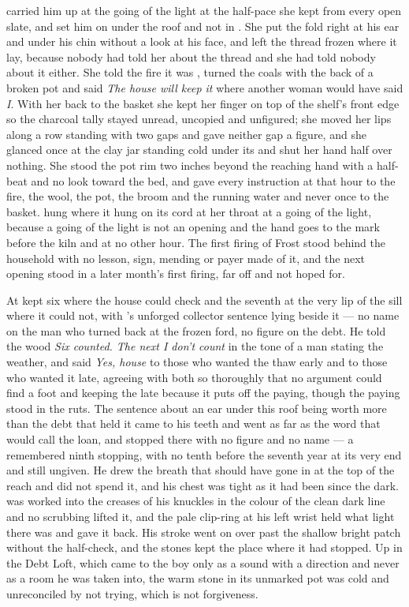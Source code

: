  carried him up at the going of the light at the half-pace she kept from every open slate, and set him on  under the roof and not in . She put the fold right at his ear and under his chin without a look at his face, and left the thread frozen where it lay, because nobody had told her about the thread and she had told nobody about it either. She told the fire it was , turned the coals with the back of a broken pot and said \emph{The house will keep it} where another woman would have said \emph{I}. With her back to the basket she kept her finger on top of the shelf's front edge so the charcoal tally stayed unread, uncopied and unfigured; she moved her lips along a row standing with two gaps and gave neither gap a figure, and she glanced once at the clay jar standing cold under its  and shut her hand half over nothing. She stood the pot rim two inches beyond the reaching hand with a half-beat and no look toward the bed, and gave every instruction at that hour to the fire, the wool, the pot, the broom and the running water and never once to the basket.  hung where it hung on its cord at her throat at a going of the light, because a going of the light is not an opening and the hand goes to the mark before the kiln and at no other hour. The first firing of Frost stood behind the household with no lesson, sign, mending or payer made of it, and the next opening stood in a later month's first firing, far off and not hoped for.

At   kept six where the house could check and the seventh at the very lip of the sill where it could not, with 's unforged collector sentence lying beside it --- no name on the man who turned back at the frozen ford, no figure on the debt. He told the wood \emph{Six counted. The next I don't count} in the tone of a man stating the weather, and said \emph{Yes, house} to those who wanted the thaw early and to those who wanted it late, agreeing with both so thoroughly that no argument could find a foot and keeping the late because it puts off the paying, though the paying stood in the ruts. The sentence about an ear under this roof being worth more than the debt that held it came to his teeth and went as far as the word that would call the loan, and stopped there with no figure and no name --- a remembered ninth stopping, with no tenth before the seventh year at its very end and still ungiven. He drew the breath that should have gone in at the top of the reach and did not spend it, and his chest was tight as it had been since the dark.  was worked into the creases of his knuckles in the colour of the clean dark line and no scrubbing lifted it, and the pale clip-ring at his left wrist held what light there was and gave it back. His stroke went on over  past the shallow bright patch without the half-check, and the stones kept the place where it had stopped. Up in the Debt Loft, which came to the boy only as a sound with a direction and never as a room he was taken into, the warm stone in its unmarked pot was cold and unreconciled by not trying, which is not forgiveness.

